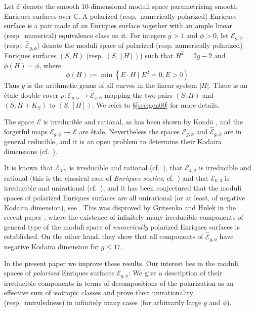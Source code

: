 \documentclass[11pt]{amsart}
\theoremstyle{definition}
\def\min{\operatorname{min}}
\def\E{{\mathcal E}}
\begin{document}
Let $\E$ denote the  smooth  $10$-dimensional   moduli space
parametrizing smooth Enriques surfaces over  $\mathbb C$.  
A  polarized (resp.\ numerically polarized) Enriques surface
is a pair made of an Enriques surface together with an ample linear
(resp.\ numerical) equivalence class on it.
For integers $g>1$ and $\phi>0$, let 
$\E_{g,\phi}$ (resp., $\widehat{\E}_{g,\phi}$) denote the moduli
space of polarized (resp. numerically polarized) 
Enriques surfaces $(S,H)$ (resp. $(S,[H])$) 
such that 
$H^2=2g-2$ and $\phi(H)=\phi$, where
\begin{equation} \label{eq:defphi}
\phi(H):=\min \left\{E \cdot H \; | \; E^2=0, E > 0\right\}.
\end{equation}
Thus $g$ is the arithmetic genus of all curves in the linear system
$|H|$. There is an étale double cover $\rho: \E_{g,\phi} \to
\widehat{\E}_{g,\phi}$ mapping 
the two pairs
$(S,H)$ and $(S,H+K_S)$ to $(S,[H])$.   We refer to \S \ref{sec:gen00} for more details.  

The space $\E$ is irreducible and rational, as has been shown
by Kond{\=o} \cite{Ko},
and the forgetful maps $\E_{g,\phi} \to \E$ are étale.
Nevertheless
the spaces  $\E_{g,\phi}$ and $\widehat{\E}_{g,\phi}$ are in
general reducible,
and it is an open problem to \color{black} determine their Kodaira dimensions
\color{black} (cf.~\cite{dol}).


It is known that
$\E_{3,2}$ is irreducible and rational (cf.\ \cite{Ca}), that
$\E_{4,2}$ is irreducible and rational (this is the classical case of
\emph{Enriques sextics}, cf.\ \cite[\S 3]{dol}) and that $\E_{6,3}$
is irreducible and unirational (cf.\ \cite{Ve}),
and it  has  been
conjectured that the moduli spaces of polarized Enriques surfaces are
all unirational (or at least, of negative Kodaira dimension), 
see \cite[\S 4] {dol}.
\color{black}This was disproved by Gritsenko and Hulek in the recent paper  \cite{GrHu}, where the existence of \color{black} infinitely many irreducible components of general type
of the moduli 
space of  {\it numerically}  polarized Enriques surfaces \color{black} is established\color{black}. On the
other hand, they show that  all components of  
$\widehat{\E}_{g,\phi}$  have  negative Kodaira dimension  for  $g
\leqslant 17$. 

 

In the present paper we  improve these  results.  Our interest lies in the moduli spaces of {\it polarized}  Enriques  surfaces $\E_{g,\phi}$:  
We give  a description  of  their  irreducible components  in  terms of decompositions of the
polarization as  an effective  sum of isotropic classes and prove
their unirationality (resp.\  uniruledness)
in infinitely many cases (for arbitrarily large $g$
and $\phi$). 
\end{document}
